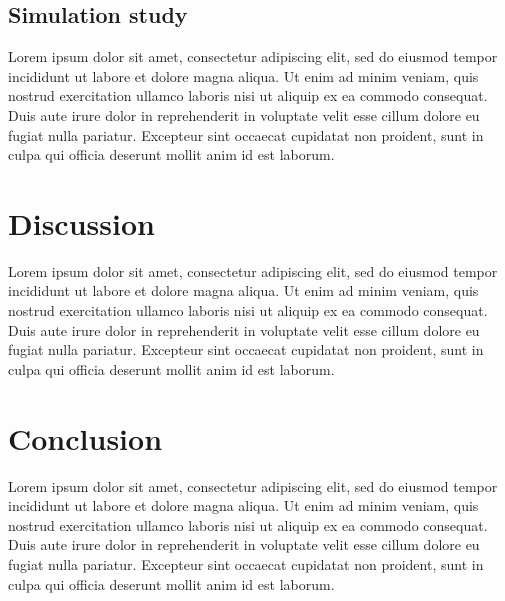 \documentclass[preprint, 3p, authoryear]{elsarticle} %
\begin{document}
\hypertarget{simulation-study-1}{%
\subsection{Simulation study}\label{simulation-study-1}}

Lorem ipsum dolor sit amet, consectetur adipiscing elit, sed do eiusmod tempor incididunt ut labore et dolore magna aliqua. Ut enim ad minim veniam, quis nostrud exercitation ullamco laboris nisi ut aliquip ex ea commodo consequat. Duis aute irure dolor in reprehenderit in voluptate velit esse cillum dolore eu fugiat nulla pariatur. Excepteur sint occaecat cupidatat non proident, sunt in culpa qui officia deserunt mollit anim id est laborum.

\hypertarget{discussion}{%
\section{Discussion}\label{discussion}}

Lorem ipsum dolor sit amet, consectetur adipiscing elit, sed do eiusmod tempor incididunt ut labore et dolore magna aliqua. Ut enim ad minim veniam, quis nostrud exercitation ullamco laboris nisi ut aliquip ex ea commodo consequat. Duis aute irure dolor in reprehenderit in voluptate velit esse cillum dolore eu fugiat nulla pariatur. Excepteur sint occaecat cupidatat non proident, sunt in culpa qui officia deserunt mollit anim id est laborum.

\hypertarget{conclusion}{%
\section{Conclusion}\label{conclusion}}

Lorem ipsum dolor sit amet, consectetur adipiscing elit, sed do eiusmod tempor incididunt ut labore et dolore magna aliqua. Ut enim ad minim veniam, quis nostrud exercitation ullamco laboris nisi ut aliquip ex ea commodo consequat. Duis aute irure dolor in reprehenderit in voluptate velit esse cillum dolore eu fugiat nulla pariatur. Excepteur sint occaecat cupidatat non proident, sunt in culpa qui officia deserunt mollit anim id est laborum.

\renewcommand\refname{References}

\end{document}
